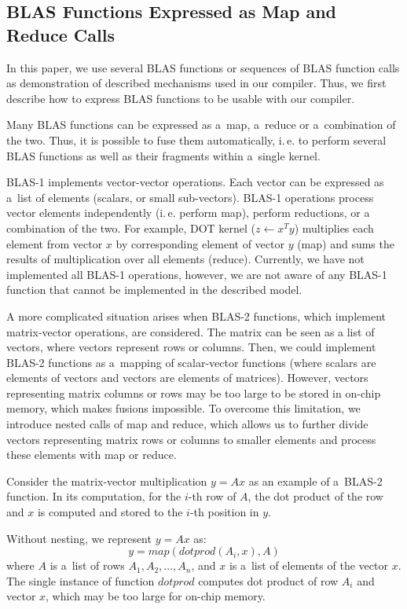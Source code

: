 \documentclass[final]{siamltex}
\def\ie{i.\,e.}
\begin{document}
{\subsection{BLAS Functions Expressed as Map and Reduce Calls}
\label{sect:blas_mapred}

In this paper, we use several BLAS functions or sequences of BLAS function calls as demonstration of described mechanisms used in our compiler. Thus, we first describe how to express BLAS functions to be usable with our compiler.

Many BLAS functions can be expressed as a~map, a~reduce or a~combination of the two. Thus, it is possible to fuse them automatically, \ie{} to perform several BLAS functions as well as their fragments within a~single kernel.

BLAS-1 implements vector-vector operations. Each vector can be expressed as a~list of elements (scalars, or small sub-vectors). BLAS-1 operations process vector elements independently (\ie{} perform map), perform reductions, or a combination of the two. For example, DOT kernel ($z \leftarrow x^T y$) multiplies each element from vector $x$ by corresponding element of vector $y$ (map) and sums the  results of multiplication over all elements (reduce). Currently, we have not implemented all BLAS-1 operations, however, we are not aware of any BLAS-1 function that cannot be implemented in the described model.

A more complicated situation arises when BLAS-2 functions, which implement matrix-vector operations, are considered. 
The matrix can be seen as a list of vectors, where vectors represent rows or columns. Then, we could implement BLAS-2 functions as a~mapping of scalar-vector functions (where scalars are elements of vectors and vectors are elements of matrices).
However, vectors representing matrix columns or rows may be too large to be stored in on-chip memory, which makes fusions impossible. To overcome this limitation, we introduce nested calls of map and reduce, which allows us to further divide vectors representing matrix rows or columns to smaller elements and process these elements with map or reduce. 

Consider the matrix-vector multiplication $y = Ax$ as an example of a~BLAS-2 function. In its computation, for the $i$-th row of $A$, the dot product of the row and $x$ is computed and stored to the $i$-th position in $y$.

Without nesting, we represent $y = Ax$ as:
\begin{equation}
\label{eq:sgemv_unnested}
y = map(dotprod(A_i, x), A)
\end{equation}
where $A$ is a~list of rows $A_1, A_2, \dotsc, A_n$,  and $x$ is a~list of elements of the vector $x$. The single instance of function $dotprod$ computes dot product of row $A_i$ and vector $x$, which may be too large for on-chip memory.

}
\end{document}
